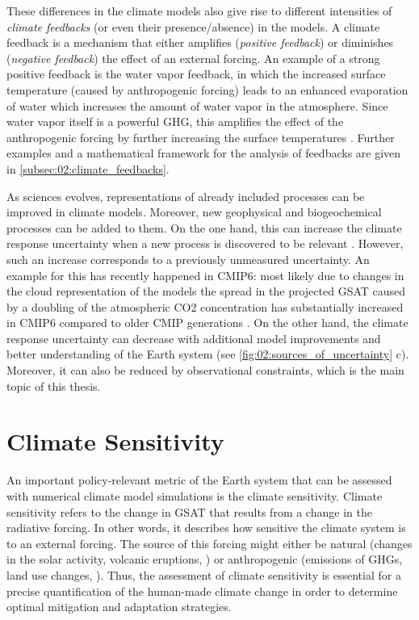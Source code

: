 These differences in the climate models also give rise to different intensities
of \emph{climate feedbacks} (or even their presence/absence) in the models. A
climate feedback is a mechanism that either amplifies (\emph{positive
  feedback}) or diminishes (\emph{negative feedback}) the effect of an external
forcing. An example of a strong positive feedback is the water vapor feedback,
in which the increased surface temperature (caused by anthropogenic forcing)
leads to an enhanced evaporation of water which increases the amount of water
vapor in the atmosphere. Since water vapor itself is a powerful \ac{GHG}, this
amplifies the effect of the anthropogenic forcing by further increasing the
surface temperatures \autocite{Cubasch2013}. Further examples and a
mathematical framework for the analysis of feedbacks are given in
\cref{subsec:02:climate_feedbacks}.

As sciences evolves, representations of already included processes can be
improved in climate models. Moreover, new geophysical and biogeochemical
processes can be added to them. On the one hand, this can increase the climate
response uncertainty when a new process is discovered to be relevant
. However, such an
increase corresponds to a previously unmeasured uncertainty. An example for
this has recently happened in \acs{CMIP}6: most likely due to changes in the
cloud representation of the models the spread in the projected \ac{GSAT} caused
by a doubling of the atmospheric \ac{CO2} concentration has substantially
increased in \acs{CMIP}6 compared to older \ac{CMIP} generations
\autocite{Zelinka2020}. On the other hand, the climate response uncertainty can
decrease with additional model improvements and better understanding of the
Earth system (see \cref{fig:02:sources_of_uncertainty}{\color{BrownRed} c}).
Moreover, it can also be reduced by observational constraints, which is the
main topic of this thesis.


\section{Climate Sensitivity}
\label{sec:02:climate_sensitivity}

An important policy-relevant metric of the Earth system that can be assessed
with numerical climate model simulations is the climate sensitivity. Climate
sensitivity refers to the change in \ac{GSAT} that results from a change in the
radiative forcing. In other words, it describes how sensitive the climate
system is to an external forcing. The source of this forcing might either be
natural (changes in the solar activity, volcanic eruptions, \etc{}) or
anthropogenic (emissions of \acp{GHG}, land use changes, \etc{}). Thus, the
assessment of climate sensitivity is essential for a precise quantification of
the human-made climate change in order to determine optimal mitigation and
adaptation strategies.


